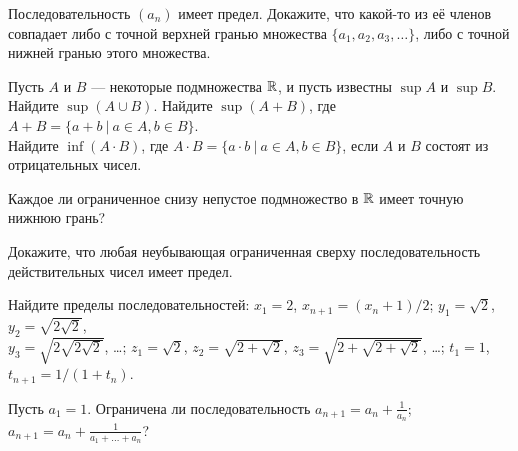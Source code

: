 \documentclass[a4paper,11pt]{article}
\begin{document}
Последовательность $(a_n)$ имеет предел.
Докажите, что какой-то из её членов
совпадает либо с точной верхней гранью
множества $\{a_1,a_2,a_3,\dots\}$, либо с точной нижней гранью этого
множества.



 Пусть $A$ и $B$ --- некоторые подмножества $\mathbb{R}$,
и пусть известны $\sup A$ и $\sup B$.\\
 Найдите $\sup (A \cup B)$. \quad
{} Найдите $\sup (A+B)$,
где $A+B = \{ a+b\ |\ a\in A, b\in B\}$.\\ %
 Найдите $\inf(A\cdot B)$, где
$A\cdot B=\{ a\cdot b\ |\ a\in A, b\in B\}$,
если $A$ и $B$ состоят из отрицательных чисел.

\smallskip
{}

\smallskip

Каждое ли ограниченное снизу непустое подмножество в $\mathbb{R}$
имеет точную нижнюю грань?

Докажите, что любая
неубывающая ограниченная сверху последовательность
действительных чисел имеет предел.

 Найдите пределы %
последовательностей:
 $x_1=2$, $x_{n+1}=(x_n+1)/2$;
 $y_1=\sqrt2$, $y_2=\sqrt{2\sqrt2}$,\\
$y_3=\sqrt{2\sqrt{2\sqrt2}}$, \dots; %
{} $z_1=\sqrt2$, $z_2=\sqrt{2+\sqrt2}$,
$z_3=\sqrt{2+\sqrt{2+\sqrt2}}$, \dots; %
{} $t_1=1$, $t_{n+1}=1/(1+t_n)$.

Пусть $a_1=1$. Ограничена ли последовательность
 $a_{n+1}=a_n + \frac1{a_n}$;
 $a_{n+1}=a_n + \frac1{a_1+\ldots+a_n}$?
\end{document}
